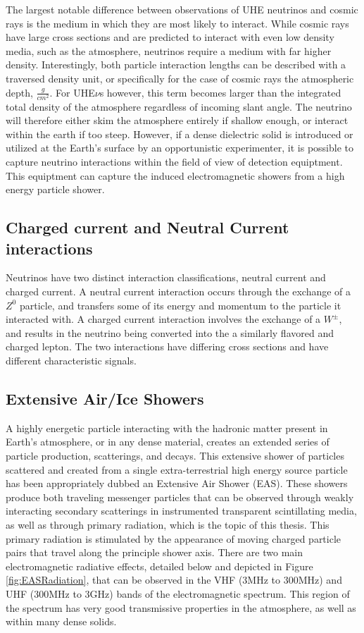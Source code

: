 	The largest notable difference between observations of UHE neutrinos and cosmic rays is the medium in which they are most likely to interact.  While cosmic rays have large cross sections and are predicted to interact with even low density media, such as the atmosphere, neutrinos require a medium with far higher density.  Interestingly, both particle interaction lengths can be described with a traversed density unit, or specifically for the case of cosmic rays the atmospheric depth, $\frac{g}{cm^{2}}$.  For UHE$\nu$s however, this term becomes larger than the integrated total density of the atmosphere regardless of incoming slant angle.  The neutrino will therefore either skim the atmosphere entirely if shallow enough, or interact within the earth if too steep.  However, if a dense dielectric solid is introduced or utilized at the Earth's surface by an opportunistic experimenter, it is possible to capture neutrino interactions within the field of view of detection equiptment.  This equiptment can capture the induced electromagnetic showers from a high energy particle shower.
	
	\subsection{Charged current and Neutral Current interactions} 
		Neutrinos have two distinct interaction classifications, neutral current and charged current.  A neutral current interaction occurs through the exchange of a $Z^{0}$ particle, and transfers some of its energy and momentum to the particle it interacted with.  A charged current interaction involves the exchange of a $W^{\pm}$, and results in the neutrino being converted into the a similarly flavored and charged lepton.  The two interactions have differing cross sections and have different characteristic signals.
				

	\subsection{Extensive Air/Ice Showers}
		A highly energetic particle interacting with the hadronic matter present in Earth's atmosphere, or in any  dense material, creates an extended series of particle production, scatterings, and decays.  This extensive shower of particles scattered and created from a single extra-terrestrial high energy source particle has been appropriately dubbed an Extensive Air Shower (EAS).  These showers produce both traveling messenger particles that can be observed through weakly interacting secondary scatterings in instrumented transparent scintillating media, as well as through primary radiation, which is the topic of this thesis.  This primary radiation is stimulated by the appearance of moving charged particle pairs that travel along the principle shower axis.  There are two main electromagnetic radiative effects, detailed below and depicted in Figure \ref{fig:EASRadiation}, that can be observed in the  VHF (3MHz to 300MHz) and UHF (300MHz to 3GHz) bands of the electromagnetic spectrum.  This region of the spectrum has very good transmissive properties in the atmosphere, as well as within many dense solids.\cite{Besson2009348}\cite{VuFind-000215473}
		

